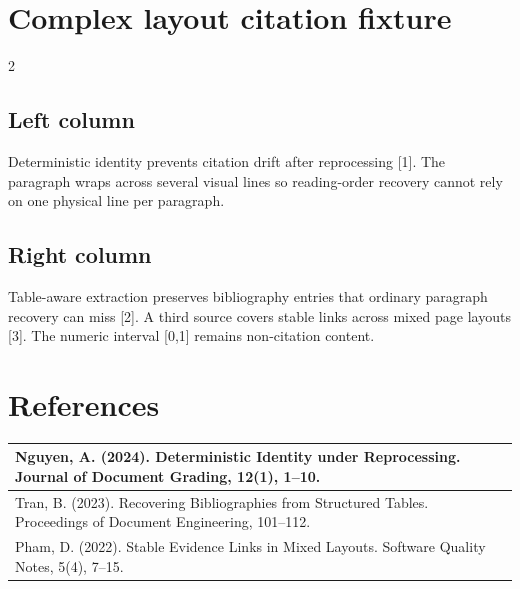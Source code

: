 \documentclass[10pt]{article}
\begin{document}
\section*{Complex layout citation fixture}

\begin{multicols}{2}
\subsection*{Left column}
Deterministic identity prevents citation drift after reprocessing [1].
The paragraph wraps across several visual lines so reading-order recovery cannot rely on one physical line per paragraph.


\columnbreak
\subsection*{Right column}
Table-aware extraction preserves bibliography entries that ordinary paragraph recovery can miss [2].
A third source covers stable links across mixed page layouts [3].
The numeric interval [0,1] remains non-citation content.
\end{multicols}

\newpage
\section*{References}

\begin{tabular}{|>{\raggedright\arraybackslash}p{}|}
\hline
[1] Nguyen, A. (2024). Deterministic Identity under Reprocessing. Journal of Document Grading, 12(1), 1--10. \\
\hline
[2] Tran, B. (2023). Recovering Bibliographies from Structured Tables. Proceedings of Document Engineering, 101--112. \\
\hline
[3] Pham, D. (2022). Stable Evidence Links in Mixed Layouts. Software Quality Notes, 5(4), 7--15. \\
\hline
\end{tabular}
\end{document}
